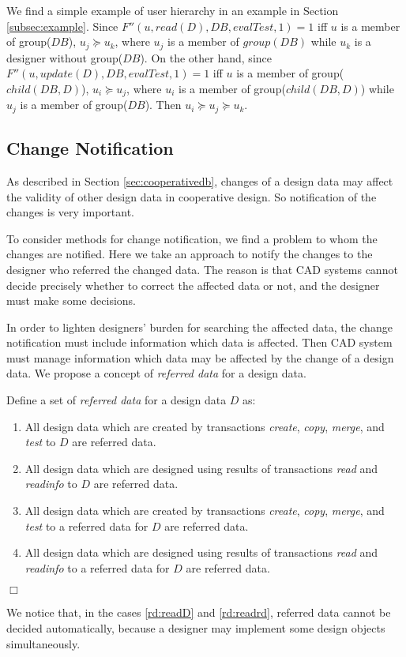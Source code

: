 We find a simple example of user hierarchy in an example in 
Section \ref{subsec:example}.
Since $F''(u, read(D), DB, evalTest, 1) = 1$ iff $u$ is a member of
group($DB$), $u_j \succeq u_k$, where $u_j$ is a member of $group(DB)$
while $u_k$ is a designer without group($DB$).
On the other hand, since $F''(u, update(D), DB, evalTest, 1) = 1$ iff
$u$ is a member of group($child(DB, D)$), $u_i \succeq u_j$, where
$u_i$ is a member of group($child(DB, D)$) while $u_j$ is a member of
group($DB$).
Then $u_i \succeq u_j \succeq u_k$.

\subsection{Change Notification}
 \label{subsec:notification}
As described in Section \ref{sec:cooperativedb}, changes of a
design data may affect the validity of other design data in 
cooperative design.
So notification of the changes is very important.

To consider methods for change notification, we find a problem to whom
the changes are notified.
Here we take an approach to notify the changes to the designer who 
referred the changed data.
The reason is that CAD systems cannot decide precisely whether to 
correct the affected data or not, and the designer must make some decisions.

In order to lighten designers' burden for searching the affected
data, the change notification must include information which 
data is affected.
Then CAD system must manage information which data may be
affected by the change of a design data.
We propose a concept of {\em referred data} for a design data.
\begin{definition} \label{def:referreddata}
Define a set of {\em referred data} for a design data $D$ as:
\begin{enumerate}
\item{\label{rd:copyD}} All design data which are created by transactions 
{\em create}, {\em copy}, {\em merge}, and {\em test} to $D$ are 
referred data.
\item{\label{rd:readD}} All design data which are designed using results 
of transactions {\em read} and {\em readinfo} to $D$ are referred data.
\item{\label{rd:copyrd}} All design data which are created by transactions 
{\em create}, {\em copy}, {\em merge}, and {\em test} to a referred 
data for $D$ are referred data.
\item{\label{rd:readrd}} All design data which are designed using results 
of transactions {\em read} and {\em readinfo} to a referred data for 
$D$ are referred data.
\end{enumerate}
\hfill$\Box$ \end{definition}
We notice that, in the cases \ref{rd:readD} and \ref{rd:readrd}, referred
data cannot be decided automatically, because a designer may implement 
some design objects simultaneously.

